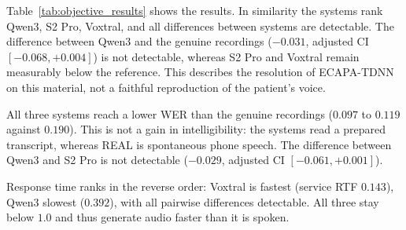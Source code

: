 

Table~\ref{tab:objective_results} shows the results. In similarity the systems
rank Qwen3, S2 Pro, Voxtral, and all differences between systems are
detectable. The difference between Qwen3 and the genuine recordings ($-0.031$,
adjusted CI $[-0.068, +0.004]$) is not detectable, whereas S2 Pro and Voxtral
remain measurably below the reference. This describes the resolution of
ECAPA-TDNN on this material, not a faithful reproduction of the patient's
voice.

All three systems reach a lower WER than the genuine recordings ($0.097$ to
$0.119$ against $0.190$). This is not a gain in intelligibility: the systems
read a prepared transcript, whereas REAL is spontaneous phone speech. The
difference between Qwen3 and S2 Pro is not detectable ($-0.029$, adjusted CI
$[-0.061, +0.001]$).

Response time ranks in the reverse order: Voxtral is fastest (service RTF
$0.143$), Qwen3 slowest ($0.392$), with all pairwise differences detectable.
All three stay below $1.0$ and thus generate audio faster than it is spoken.

